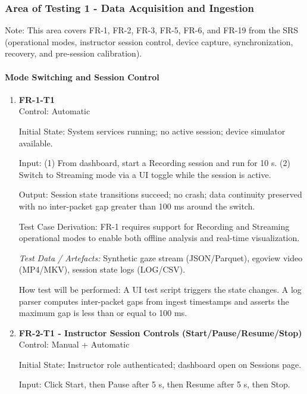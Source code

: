 \documentclass[12pt, titlepage]{article}
\begin{document}
\subsubsection{Area of Testing 1 - Data Acquisition and Ingestion}

Note: This area covers FR-1, FR-2, FR-3, FR-5, FR-6, and FR-19 from the SRS (operational modes, instructor session control, device capture, synchronization, recovery, and pre-session calibration).

\paragraph{Mode Switching and Session Control}

\begin{enumerate}

\item \textbf{FR-1-T1} \\

Control: Automatic

Initial State: System services running; no active session; device simulator available.

Input: (1) From dashboard, start a Recording session and run for 10 s. (2) Switch to Streaming mode via a UI toggle while the session is active.

Output: Session state transitions succeed; no crash; data continuity preserved with no inter-packet gap greater than 100 ms around the switch.

Test Case Derivation: FR-1 requires support for Recording and Streaming operational modes to enable both offline analysis and real-time visualization.

\textit{Test Data / Artefacts:} Synthetic gaze stream (JSON/Parquet), egoview video (MP4/MKV), session state logs (LOG/CSV).

How test will be performed: A UI test script triggers the state changes. A log parser computes inter-packet gaps from ingest timestamps and asserts the maximum gap is less than or equal to 100 ms.

\item \textbf{FR-2-T1 - Instructor Session Controls (Start/Pause/Resume/Stop)} \\

Control: Manual + Automatic

Initial State: Instructor role authenticated; dashboard open on Sessions page.

Input: Click Start, then Pause after 5 s, then Resume after 5 s, then Stop.


\end{enumerate}
\end{document}
